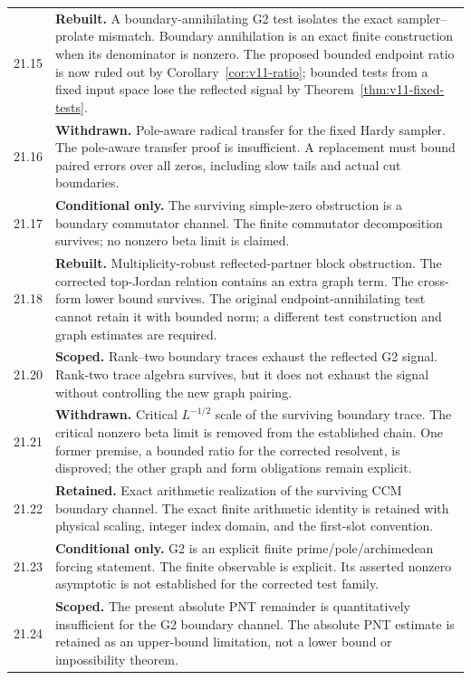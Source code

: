 \documentclass[11pt]{article}
\theoremstyle{remark}
\begin{document}
\begin{longtable}{@{}p{}p{}@{}}
21.15 & \textbf{Rebuilt.} A boundary-annihilating G2 test isolates the exact sampler--prolate mismatch. Boundary annihilation is an exact finite construction when its denominator is nonzero. The proposed bounded endpoint ratio is now ruled out by Corollary~\ref{cor:v11-ratio}; bounded tests from a fixed input space lose the reflected signal by Theorem~\ref{thm:v11-fixed-tests}. \\[4pt]
21.16 & \textbf{Withdrawn.} Pole-aware radical transfer for the fixed Hardy sampler. The pole-aware transfer proof is insufficient. A replacement must bound paired errors over all zeros, including slow tails and actual cut boundaries. \\[4pt]
21.17 & \textbf{Conditional only.} The surviving simple-zero obstruction is a boundary commutator channel. The finite commutator decomposition survives; no nonzero beta limit is claimed. \\[4pt]
21.18 & \textbf{Rebuilt.} Multiplicity-robust reflected-partner block obstruction. The corrected top-Jordan relation contains an extra graph term. The cross-form lower bound survives. The original endpoint-annihilating test cannot retain it with bounded norm; a different test construction and graph estimates are required. \\[4pt]
21.20 & \textbf{Scoped.} Rank--two boundary traces exhaust the reflected G2 signal. Rank-two trace algebra survives, but it does not exhaust the signal without controlling the new graph pairing. \\[4pt]
21.21 & \textbf{Withdrawn.} Critical $L^{-1/2}$ scale of the surviving boundary trace. The critical nonzero beta limit is removed from the established chain. One former premise, a bounded ratio for the corrected resolvent, is disproved; the other graph and form obligations remain explicit. \\[4pt]
21.22 & \textbf{Retained.} Exact arithmetic realization of the surviving CCM boundary channel. The exact finite arithmetic identity is retained with physical scaling, integer index domain, and the first-slot convention. \\[4pt]
21.23 & \textbf{Conditional only.} G2 is an explicit finite prime/pole/archimedean forcing statement. The finite observable is explicit. Its asserted nonzero asymptotic is not established for the corrected test family. \\[4pt]
21.24 & \textbf{Scoped.} The present absolute PNT remainder is quantitatively insufficient for the G2 boundary channel. The absolute PNT estimate is retained as an upper-bound limitation, not a lower bound or impossibility theorem. \\[4pt]

\end{longtable}
\end{document}

